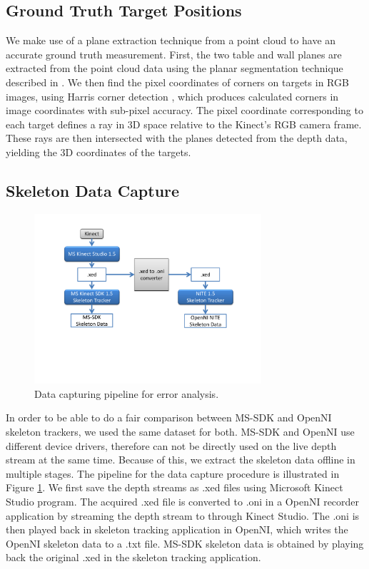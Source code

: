 \subsection{Ground Truth Target Positions}
\label{sec:ground_truth_points}

We make use of a plane extraction technique from a point cloud to have an accurate ground truth measurement. First, the two table and wall planes are extracted from the point cloud data using the planar segmentation technique described in \cite{trevor2013segmentation}. We then find the pixel coordinates of corners on targets in RGB images, using Harris corner detection \cite{harris1988combined}, which produces calculated corners in image coordinates with sub-pixel accuracy. The pixel coordinate corresponding to each target defines a ray in 3D space relative to the Kinect's RGB camera frame. These rays are then intersected with the planes detected from the depth data, yielding the 3D coordinates of the targets.



\subsection{Skeleton Data Capture}
\label{sec:pointing_skeleton_data_capture}

\begin{figure}[h]
\centering
\includegraphics[width=0.75\textwidth]{pics/xedoni_2_cropped}
\caption{Data capturing pipeline for error analysis.}
\label{fig:xedoni}
\end{figure}

In order to be able to do a fair comparison between MS-SDK and OpenNI skeleton trackers, we used the same dataset for both. MS-SDK and OpenNI use different device drivers, therefore can not be directly used on the live depth stream at the same time. Because of this, we extract the skeleton data offline in multiple stages. The pipeline for the data capture procedure is illustrated in Figure \ref{fig:xedoni}. We first save the depth streams as .xed files using Microsoft Kinect Studio program. The acquired .xed file is converted to .oni in a OpenNI recorder application by streaming the depth stream to through Kinect Studio. The .oni is then played back in skeleton tracking application in OpenNI, which writes the OpenNI skeleton data to a .txt file. MS-SDK skeleton data is obtained by playing back the original .xed in the skeleton tracking application.

